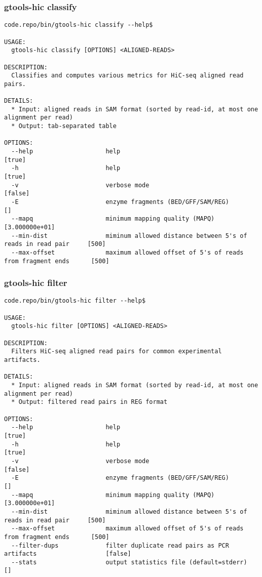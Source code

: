 \subsubsection{gtools-hic classify}\label{gtools-hic_classify}
\begin{lstlisting}
code.repo/bin/gtools-hic classify --help$

USAGE:
  gtools-hic classify [OPTIONS] <ALIGNED-READS>

DESCRIPTION:
  Classifies and computes various metrics for HiC-seq aligned read pairs.

DETAILS:
  * Input: aligned reads in SAM format (sorted by read-id, at most one alignment per read)
  * Output: tab-separated table

OPTIONS:
  --help                    help                                                           [true]
  -h                        help                                                           [true]
  -v                        verbose mode                                                   [false]
  -E                        enzyme fragments (BED/GFF/SAM/REG)                             []
  --mapq                    minimum mapping quality (MAPQ)                                 [3.000000e+01]
  --min-dist                miminum allowed distance between 5's of reads in read pair     [500]
  --max-offset              maximum allowed offset of 5's of reads from fragment ends      [500]

\end{lstlisting}
%
\subsubsection{gtools-hic filter}\label{gtools-hic_filter}
\begin{lstlisting}
code.repo/bin/gtools-hic filter --help$

USAGE:
  gtools-hic filter [OPTIONS] <ALIGNED-READS>

DESCRIPTION:
  Filters HiC-seq aligned read pairs for common experimental artifacts.

DETAILS:
  * Input: aligned reads in SAM format (sorted by read-id, at most one alignment per read)
  * Output: filtered read pairs in REG format

OPTIONS:
  --help                    help                                                           [true]
  -h                        help                                                           [true]
  -v                        verbose mode                                                   [false]
  -E                        enzyme fragments (BED/GFF/SAM/REG)                             []
  --mapq                    minimum mapping quality (MAPQ)                                 [3.000000e+01]
  --min-dist                miminum allowed distance between 5's of reads in read pair     [500]
  --max-offset              maximum allowed offset of 5's of reads from fragment ends      [500]
  --filter-dups             filter duplicate read pairs as PCR artifacts                   [false]
  --stats                   output statistics file (default=stderr)                        []
\end{lstlisting}
%
